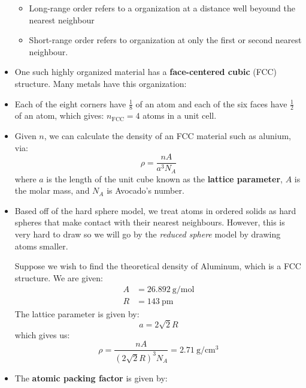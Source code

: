 \begin{itemize}
    \begin{itemize}
        \item Long-range order refers to a organization at a distance well beyound the nearest neighbour
        \item Short-range order refers to organization at only the first or second nearest neighbour.
    \end{itemize}
    \item One such highly organized material has a \textbf{face-centered cubic} (FCC) structure. Many metals have this organization:
    \begin{figure}[ht]
        \centering
    \end{figure}
    \item Each of the eight corners have $\frac{1}{8}$ of an atom and each of the six faces have $\frac{1}{2}$ of an atom, which gives: $n_\text{FCC}=4$ atoms in a unit cell.
    \item Given $n$, we can calculate the density of an FCC material such as alunium, via:
    \begin{equation}
        \rho = \frac{n A}{a^3N_A}
    \end{equation}
    where $a$ is the length of the unit cube known as the \textbf{lattice parameter}, $A$ is the molar mass, and $N_A$ is Avocado's number.
    \item Based off of the hard sphere model, we treat atoms in ordered solids as hard spheres that make contact with their nearest neighbours. However, this is very hard to draw so we will go by the \textit{reduced sphere} model by drawing atoms smaller.
    \begin{example}
        Suppose we wish to find the theoretical density of Aluminum, which is a FCC structure. We are given:
        \begin{align*}
            A &= \SI{26.892}{\gram\per\mole} \\ 
            R &= \SI{143}{\pico\meter}
        \end{align*}
        The lattice parameter is given by:
        \begin{equation}
            a = 2\sqrt{2}R
        \end{equation}
        which gives us:
        \begin{equation}
            \rho = \frac{nA}{(2\sqrt{2}R)^3 N_A} = \SI{2.71}{\gram\per\centi\meter\cubed}
        \end{equation}
    \end{example}
    \item The \textbf{atomic packing factor} is given by:

\end{itemize}
